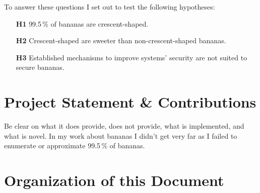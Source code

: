 To answer these questions I set out to test the following hypotheses:

\begin{itemize}
  \item[\textbf{H1}]{99.5\,\% of bananas are crescent-shaped.}
  \item[\textbf{H2}]{Crescent-shaped are sweeter than non-crescent-shaped
    bananas.}
  \item[\textbf{H3}]{Established mechanisms to improve systems' security
    are not suited to secure bananas.}
\end{itemize}


\section{Project Statement \& Contributions}

Be clear on what it does provide, does not provide, what is implemented,
and what is novel. In my work about bananas I didn't get very far as I
failed to enumerate or approximate 99.5\,\% of bananas.


\section{Organization of this Document}


